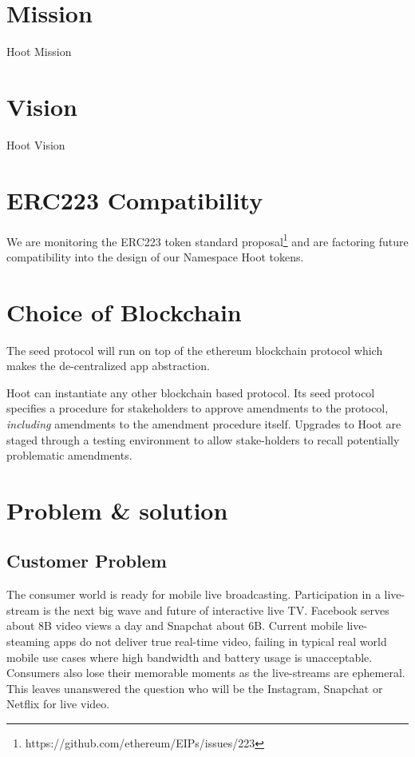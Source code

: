 \documentclass{article}
\begin{document}
\section{Mission}
Hoot Mission

\section{Vision}
Hoot Vision

\section{ERC223 Compatibility}
We are monitoring the ERC223 token standard proposal\footnote{https://github.com/ethereum/EIPs/issues/223} and are factoring future compatibility into the design of our Namespace Hoot tokens.

\section{Choice of Blockchain}
The seed protocol will run on top of the ethereum blockchain protocol which makes the de-centralized app abstraction. 


Hoot can instantiate any other blockchain based protocol. Its seed protocol specifies a procedure for stakeholders to approve amendments to the protocol,
\emph{including} amendments to the amendment procedure itself.
Upgrades to Hoot are staged through a testing environment to allow stake-holders to recall potentially problematic amendments.


\section{Problem \& solution}

\subsection{Customer Problem}
The consumer world is ready for mobile live broadcasting. Participation in a live-stream is the next big wave and future of interactive live TV. Facebook serves about 8B video views a day and Snapchat about 6B. Current mobile live-steaming apps do not deliver true real-time video, failing in typical real world mobile use cases where high bandwidth and battery usage is unacceptable. Consumers also lose their memorable moments as the live-streams are ephemeral. This leaves unanswered the question who will be the Instagram, Snapchat or Netflix for live video.
\end{document}
